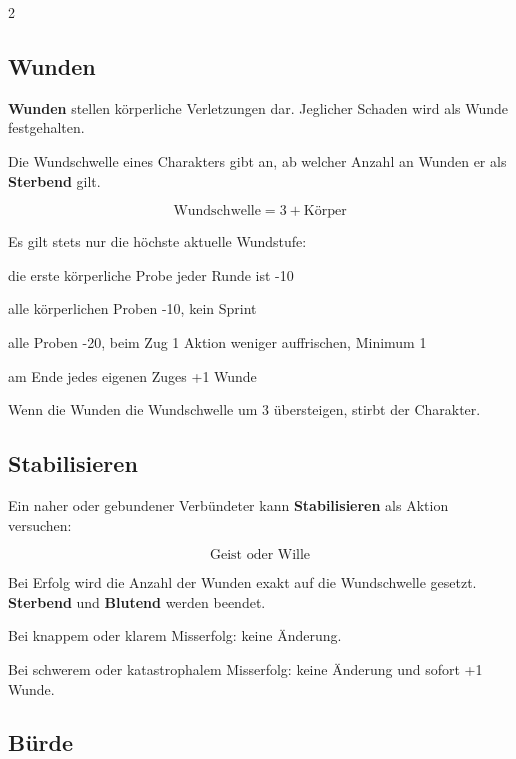 \begin{multicols*}{2}
\subsection{Wunden}\label{sec:wunden}

\textbf{Wunden} stellen körperliche Verletzungen dar.
Jeglicher Schaden wird als Wunde festgehalten.

Die Wundschwelle eines Charakters gibt an, ab welcher Anzahl an Wunden er als \textbf{Sterbend} gilt.

\[
\text{Wundschwelle} = 3 + \text{Körper}
\]

Es gilt stets nur die höchste aktuelle Wundstufe:

\begin{description}[style=nextline,leftmargin=0pt]
\item[\textbf{Verletzt} (1+)] die erste körperliche Probe jeder Runde ist -10
\item[\textbf{Beeinträchtigt} (3+)] alle körperlichen Proben -10, kein Sprint
\item[\textbf{Kritisch} (5+)] alle Proben -20, beim Zug 1 Aktion weniger auffrischen, Minimum 1
\item[\textbf{Sterbend} (> Threshold)] am Ende jedes eigenen Zuges +1 Wunde
\end{description}

Wenn die Wunden die Wundschwelle um 3 übersteigen, stirbt der Charakter.

\subsection{Stabilisieren}\label{sec:stabilisieren}

Ein naher oder gebundener Verbündeter kann \textbf{Stabilisieren} als Aktion versuchen:

\[
\text{Geist oder Wille}
\]

Bei Erfolg wird die Anzahl der Wunden exakt auf die Wundschwelle gesetzt.
\textbf{Sterbend} und \textbf{Blutend} werden beendet.

Bei knappem oder klarem Misserfolg: keine Änderung.

Bei schwerem oder katastrophalem Misserfolg: keine Änderung und sofort +1 Wunde.

\subsection{Bürde}\label{sec:burde}


\end{multicols*}
